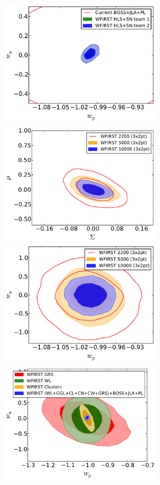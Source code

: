 \begin{figure}
\includegraphics[width=8cm]{Plots/forecasts/WFIRST_2SNteams_zoom.pdf}
\includegraphics[width=8cm]{Plots/forecasts/WFIRST_extended_MG.pdf}
\includegraphics[width=8cm]{Plots/forecasts/WFIRST_extended.pdf}
\includegraphics[width=8cm]{Plots/forecasts/WFIRST_ini_vs_multi.pdf}

\end{figure}
